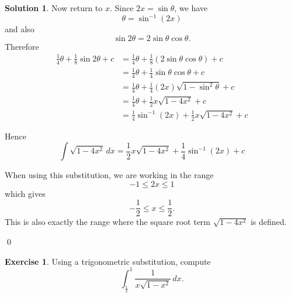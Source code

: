 \documentclass[a4paper]{article}
\theoremstyle{plain}
\theoremstyle{definition}
\newtheorem*{solution}{Solution}
\newtheorem{exercise}{Exercise}
\numberwithin{equation}{subsection}
\begin{document}
\begin{solution}
Now return to $x$. Since $2x = \sin \theta$, we have
\[
    \theta = \sin^{-1}(2x)
\]
and also
\[
    \sin 2\theta = 2\sin \theta \cos \theta.
\]
Therefore
\begin{align*}
    \frac{1}{4}\theta + \frac{1}{8}\sin 2\theta + c
    &= \frac{1}{4}\theta + \frac{1}{8}\left(2\sin \theta \cos \theta\right) + c\\
    &= \frac{1}{4}\theta + \frac{1}{4}\sin \theta \cos \theta + c\\
    &= \frac{1}{4}\theta + \frac{1}{4}(2x)\sqrt{1-\sin^2\theta} + c\\
    &= \frac{1}{4}\theta + \frac{1}{2}x\sqrt{1-4x^2} + c\\
    &= \frac{1}{4}\sin^{-1}(2x) + \frac{1}{2}x\sqrt{1-4x^2} + c
\end{align*}

Hence
\[
    \int \sqrt{1 - 4x^2} \, dx
    = \frac{1}{2}x\sqrt{1-4x^2} + \frac{1}{4}\sin^{-1}(2x) + c
\]

When using this substitution, we are working in the range
\[
    -1 \leq 2x \leq 1
\]
which gives
\[
    -\frac{1}{2} \leq x \leq \frac{1}{2}.
\]
This is also exactly the range where the square root term $\sqrt{1-4x^2}$ is defined.

\qed
\end{solution}


\begin{exercise}
Using a trigonometric substitution, compute
\[
    \int_{\frac{1}{2}}^{1}\frac{1}{x\sqrt{1-x^2}}\,dx.
\]
\end{exercise}
\end{document}
